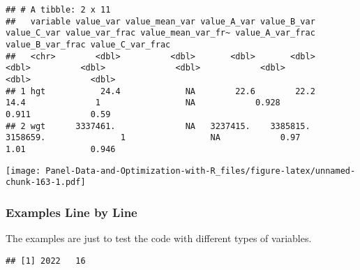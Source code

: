 \documentclass[
]{book}
\newenvironment{Shaded}{\begin{snugshade}}{\end{snugshade}}
\newcommand{\DataTypeTok}[1]{\textcolor[rgb]{0.13,0.29,0.53}{#1}}
\newcommand{\DecValTok}[1]{\textcolor[rgb]{0.00,0.00,0.81}{#1}}
\newcommand{\KeywordTok}[1]{\textcolor[rgb]{0.13,0.29,0.53}{\textbf{#1}}}
\newcommand{\NormalTok}[1]{#1}
\newcommand{\OperatorTok}[1]{\textcolor[rgb]{0.81,0.36,0.00}{\textbf{#1}}}
\newcommand{\StringTok}[1]{\textcolor[rgb]{0.31,0.60,0.02}{#1}}
\begin{document}
\begin{verbatim}
## # A tibble: 2 x 11
##   variable value_var value_mean_var value_A_var value_B_var value_C_var value_var_frac value_mean_var_fr~ value_A_var_frac value_B_var_frac value_C_var_frac
##   <chr>        <dbl>          <dbl>       <dbl>       <dbl>       <dbl>          <dbl>              <dbl>            <dbl>            <dbl>            <dbl>
## 1 hgt           24.4             NA        22.6        22.2        14.4              1                 NA            0.928            0.911            0.59 
## 2 wgt      3337461.              NA   3237415.    3385815.    3158659.               1                 NA            0.97             1.01             0.946
\end{verbatim}

\begin{Shaded}
\end{Shaded}

\texttt{[image: Panel-Data-and-Optimization-with-R\_files/figure-latex/unnamed-chunk-163-1.pdf]}

\hypertarget{examples-line-by-line-1}{%
\subsubsection{Examples Line by Line}\label{examples-line-by-line-1}}

The examples are just to test the code with different types of variables.

\begin{Shaded}
\end{Shaded}

\begin{verbatim}
## [1] 2022   16
\end{verbatim}
\end{document}
